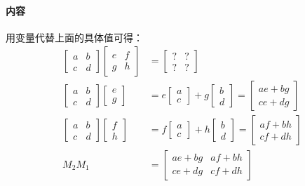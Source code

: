 \documentclass[UTF8]{ctexart}
\begin{document}
\paragraph{内容}
用变量代替上面的具体值可得：
\begin{align*}
	\begin{bmatrix}
		a&b \\ c&d
	\end{bmatrix} \begin{bmatrix}
		e&f \\ g&h
	\end{bmatrix} &= \begin{bmatrix}
		?&? \\ ?&?
	\end{bmatrix} \\ \begin{bmatrix}
		a&b \\ c&d
	\end{bmatrix} \begin{bmatrix}
		e \\ g
	\end{bmatrix} &= e \begin{bmatrix}
		a \\ c
	\end{bmatrix} + g \begin{bmatrix}
		b \\ d
	\end{bmatrix} = \begin{bmatrix}
		ae+bg \\ ce+dg
	\end{bmatrix} \\ \begin{bmatrix}
		a&b \\ c&d
	\end{bmatrix} \begin{bmatrix}
		f \\ h
	\end{bmatrix} &= f \begin{bmatrix}
		a \\ c
	\end{bmatrix} + h \begin{bmatrix}
		b \\ d
	\end{bmatrix} = \begin{bmatrix}
		af+bh \\ cf+dh
	\end{bmatrix} \\ M_2M_1 &= \begin{bmatrix}
		ae+bg & af+bh \\ ce+dg & cf+dh
	\end{bmatrix}
\end{align*}
\end{document}

